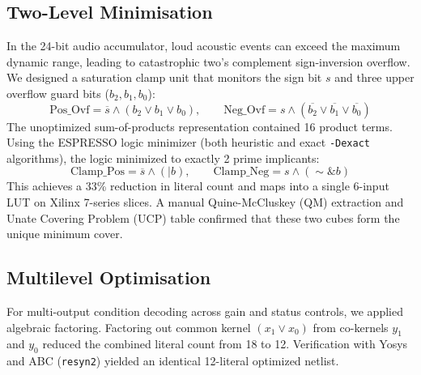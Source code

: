 \documentclass[11pt,a4paper]{article}
\begin{document}
\subsection{Two-Level Minimisation}
In the 24-bit audio accumulator, loud acoustic events can exceed the maximum dynamic range, leading to catastrophic two's complement sign-inversion overflow. We designed a saturation clamp unit that monitors the sign bit $s$ and three upper overflow guard bits ($b_2, b_1, b_0$):
\begin{equation}
  \text{Pos\_Ovf} = \overline{s} \land (b_2 \lor b_1 \lor b_0), \qquad \text{Neg\_Ovf} = s \land (\overline{b_2} \lor \overline{b_1} \lor \overline{b_0})
  \label{eq:sat_logic}
\end{equation}
The unoptimized sum-of-products representation contained 16 product terms. Using the ESPRESSO logic minimizer (both heuristic and exact \texttt{-Dexact} algorithms), the logic minimized to exactly 2 prime implicants:
\begin{equation}
  \text{Clamp\_Pos} = \overline{s} \land (|b), \qquad \text{Clamp\_Neg} = s \land (\sim\&b)
  \label{eq:sat_min}
\end{equation}
This achieves a 33\% reduction in literal count and maps into a single 6-input LUT on Xilinx 7-series slices. A manual Quine-McCluskey (QM) extraction and Unate Covering Problem (UCP) table confirmed that these two cubes form the unique minimum cover.

\subsection{Multilevel Optimisation}
For multi-output condition decoding across gain and status controls, we applied algebraic factoring. Factoring out common kernel $(x_1 \lor x_0)$ from co-kernels $y_1$ and $y_0$ reduced the combined literal count from 18 to 12. Verification with Yosys and ABC (\texttt{resyn2}) yielded an identical 12-literal optimized netlist.
\end{document}
